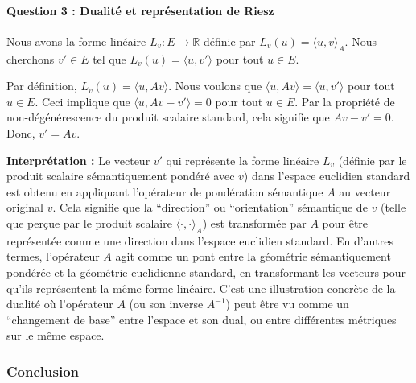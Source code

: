 \documentclass[11pt,a4paper]{report}
\begin{document}
\hypertarget{question-3-dualituxe9-et-repruxe9sentation-de-riesz}{%
\paragraph{Question 3 : Dualité et représentation de
Riesz}\label{question-3-dualituxe9-et-repruxe9sentation-de-riesz}}

Nous avons la forme linéaire \(L_v: E \to \mathbb{R}\) définie par
\(L_v(u) = \langle u, v \rangle_A\). Nous cherchons \(v' \in E\) tel que
\(L_v(u) = \langle u, v' \rangle\) pour tout \(u \in E\).

Par définition, \(L_v(u) = \langle u, Av \rangle\). Nous voulons que
\(\langle u, Av \rangle = \langle u, v' \rangle\) pour tout \(u \in E\).
Ceci implique que \(\langle u, Av - v' \rangle = 0\) pour tout
\(u \in E\). Par la propriété de non-dégénérescence du produit scalaire
standard, cela signifie que \(Av - v' = 0\). Donc, \(v' = Av\).

\textbf{Interprétation :} Le vecteur \(v'\) qui représente la forme
linéaire \(L_v\) (définie par le produit scalaire sémantiquement pondéré
avec \(v\)) dans l'espace euclidien standard est obtenu en appliquant
l'opérateur de pondération sémantique \(A\) au vecteur original \(v\).
Cela signifie que la ``direction'' ou ``orientation'' sémantique de
\(v\) (telle que perçue par le produit scalaire
\(\langle \cdot, \cdot \rangle_A\)) est transformée par \(A\) pour être
représentée comme une direction dans l'espace euclidien standard. En
d'autres termes, l'opérateur \(A\) agit comme un pont entre la géométrie
sémantiquement pondérée et la géométrie euclidienne standard, en
transformant les vecteurs pour qu'ils représentent la même forme
linéaire. C'est une illustration concrète de la dualité où l'opérateur
\(A\) (ou son inverse \(A^{-1}\)) peut être vu comme un ``changement de
base'' entre l'espace et son dual, ou entre différentes métriques sur le
même espace.

\hypertarget{conclusion}{%
\subsubsection{Conclusion}\label{conclusion}}
\end{document}
